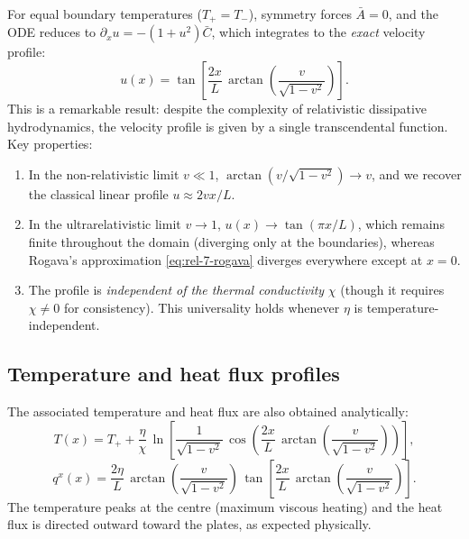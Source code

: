 For equal boundary temperatures ($T_+ = T_-$), symmetry forces $\bar{A}=0$,
and the ODE reduces to $\partial_x u = -(1+u^2)\bar{C}$, which integrates
to the \emph{exact} velocity profile:
\begin{equation}
\label{eq:rel-7-gavassino-exact}
\boxed{u(x) = \tan\!\left[\frac{2x}{L}\,
    \arctan\!\left(\frac{v}{\sqrt{1-v^2}}\right)\right].}
\end{equation}
This is a remarkable result: despite the complexity of relativistic
dissipative hydrodynamics, the velocity profile is given by a single
transcendental function.  Key properties:
\begin{enumerate}
\item In the non-relativistic limit $v \ll 1$, $\arctan(v/\sqrt{1-v^2})
  \to v$, and we recover the classical linear profile $u \approx 2vx/L$.
\item In the ultrarelativistic limit $v \to 1$, $u(x) \to \tan(\pi x/L)$,
  which remains finite throughout the domain (diverging only at the
  boundaries), whereas Rogava's approximation \eqref{eq:rel-7-rogava}
  diverges everywhere except at $x=0$.
\item The profile is \emph{independent of the thermal conductivity} $\chi$
  (though it requires $\chi \neq 0$ for consistency).  This universality
  holds whenever $\eta$ is temperature-independent.
\end{enumerate}

\subsection{Temperature and heat flux profiles}

The associated temperature and heat flux are also obtained analytically:
\begin{equation}
\label{eq:rel-7-gavassino-temp}
T(x) = T_+ + \frac{\eta}{\chi}\,\ln\!\left[
  \frac{1}{\sqrt{1-v^2}}\,\cos\!\left(
    \frac{2x}{L}\,\arctan\!\left(\frac{v}{\sqrt{1-v^2}}\right)
  \right)\right],
\end{equation}
\begin{equation}
\label{eq:rel-7-gavassino-heat}
q^x(x) = \frac{2\eta}{L}\,
  \arctan\!\left(\frac{v}{\sqrt{1-v^2}}\right)\,
  \tan\!\left[\frac{2x}{L}\,
    \arctan\!\left(\frac{v}{\sqrt{1-v^2}}\right)\right].
\end{equation}
The temperature peaks at the centre (maximum viscous heating) and the
heat flux is directed outward toward the plates, as expected physically.

